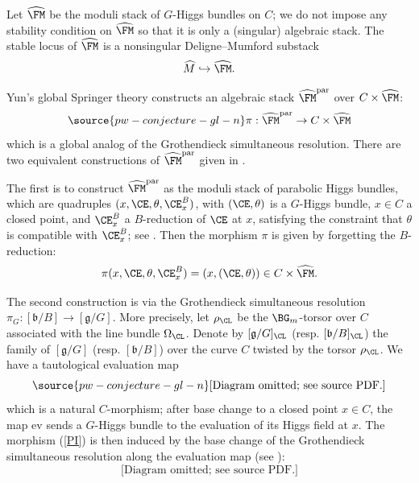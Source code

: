 Let $\widehat{\FM}$ be the moduli stack of $G$-Higgs bundles on $C$; we do not impose any stability condition on $\widehat{\FM}$ so that it is only a (singular) algebraic stack. The stable locus of $\widehat{\FM}$ is a nonsingular Deligne--Mumford substack
\[
\widehat{M} \hookrightarrow \widehat{\FM}.
\]

Yun's global Springer theory \cite{Yun1} constructs an algebraic stack $\widehat{\FM}^\mathrm{par}$ over $C \times \widehat{\FM}$:
\begin{equation}\label{PI}
\source{pw-conjecture-gl-n}
\pi: \widehat{\FM}^\mathrm{par} \to C \times \widehat{\FM}
\end{equation}
which is a global analog of the Grothendieck simultaneous resolution. There are two equivalent constructions of $\widehat{\FM}^{\mathrm{par}}$ given in \cite[Section 2.1]{Yun1}.


The first is to construct $\widehat{\FM}^{\mathrm{par}}$ as the moduli stack of parabolic Higgs bundles, which are quadruples $(x, \CE, \theta, \CE_x^B)$, with $(\CE, \theta)$ is a $G$-Higgs bundle, $x\in C$ a closed point, and $\CE_x^B$ a $B$-reduction of $\CE$ at $x$, satisfying the constraint that $\theta$ is compatible with $\CE_x^B$; see \cite[Definition 2.1.1]{Yun1}. Then the morphism $\pi$ is given by forgetting the $B$-reduction:
\[
\pi (x, \CE, \theta, \CE_x^B)  = (x, (\CE,\theta)) \in C \times \widehat{\FM}.
\]

The second construction is via the Grothendieck simultaneous resolution $\pi_G: [\mathfrak{b}/B] \to [\mathfrak{g}/G]$. More precisely, let $\rho_\CL$ be the $\BG_m$-torsor over $C$ associated with the line bundle $\Omega_\CL$. Denote by $[\mathfrak{g}/G]_\CL$ (resp. $[\mathfrak{b}/B]_\CL$) the family of $[\mathfrak{g}/G]$ (resp. $[\mathfrak{b}/B]$) over the curve $C$ twisted by the torsor $\rho_\CL$. We have a tautological evaluation map
\begin{equation}\label{evaluation}
\source{pw-conjecture-gl-n}
    \text{[Diagram omitted; see source PDF.]}
\end{equation}
which is a natural $C$-morphism; after base change to a closed point $x\in C$, the map $\mathrm{ev}$ sends a $G$-Higgs bundle to the evaluation of its Higgs field at $x$. The morphism (\ref{PI}) is then induced by the base change of the Grothendieck simultaneous resolution along the evaluation map (see \cite[Lemma 2.1.2]{Yun1}):
\begin{equation*}
\text{[Diagram omitted; see source PDF.]}
\end{equation*}

